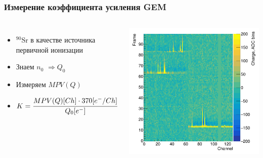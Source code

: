 \documentclass[14pt]{beamer}
\begin{document}
\begin{frame}[c]
\frametitle{Измерение коэффициента усиления GEM}
\vspace{0pt}
\begin{columns}
\vspace{10pt}
\begin{minipage}[t][1\textheight]{\linewidth}
\small{\begin{itemize}
		\item $\mathrm{^{90}Sr}$ в качестве источника первичной ионизации
		\item Знаем  $n_{0}$ $\Rightarrow Q_{0}$
		\item Измеряем $ MPV(Q)$
		\item $K = \cfrac{ MPV(Q)[Ch] \cdot 370 [e^-/Ch]}{Q_0[e^-]}$
\end{itemize}}
\end{minipage}%
\vspace{10pt}
\begin{minipage}[t][1\textheight]{\linewidth}
\center \includegraphics[width=1\textwidth]{Signal.png}

\end{minipage}%
\end{columns}
\end{frame}
\end{document}
